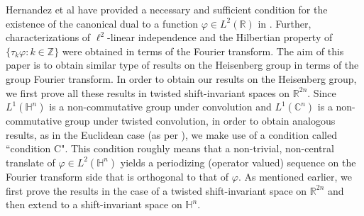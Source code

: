 \documentclass[a4paper,12pt,reqno]{amsart}
\theoremstyle{plain}
\numberwithin{equation}{section}
\theoremstyle{definition}
\begin{document}
Hernandez et al have provided a necessary and sufficient condition for the existence of the canonical dual to a function $\varphi\in L^{2}(\mathbb{R})$ in \cite{hre}. Further, characterizations of $\ell^{2}$-linear independence and the Hilbertian property of $\{\tau_{k}\varphi:k\in\mathbb{Z}\}$ were obtained in terms of the Fourier transform. The aim of this paper is to obtain similar type of results on the Heisenberg group in terms of the group Fourier transform. In order to obtain our results on the Heisenberg group, we first prove all these results in twisted shift-invariant spaces on $\mathbb{R}^{2n}$. Since $L^{1}(\mathbb{H}^{n})$ is a non-commutative group under convolution and $L^{1}(\mathbb{C}^{n})$ is a non-commutative group under twisted convolution, in order to obtain analogous results, as in the Euclidean case (as per \cite{hre}), we make use of a condition called ``condition C". This condition roughly means that a non-trivial, non-central translate of $\varphi\in L^{2}(\mathbb{H}^{n})$ yields a periodizing (operator valued) sequence on the Fourier transform side that is orthogonal to that of $\varphi$. As mentioned  earlier, we first prove the results in the case of a twisted shift-invariant space on $\mathbb{R}^{2n}$ and then extend to a  shift-invariant space on $\mathbb{H}^{n}$.
\end{document}
